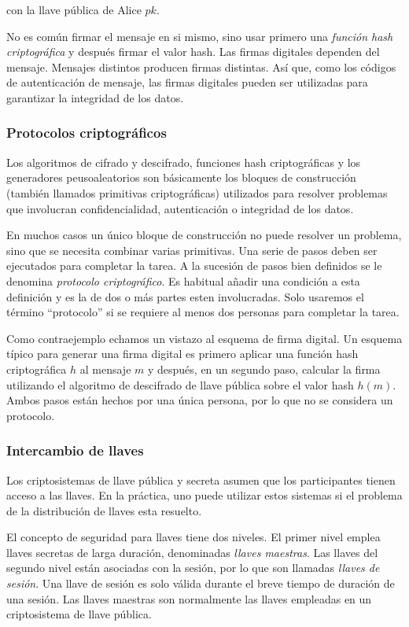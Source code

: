 \documentclass[12pt]{article}
\theoremstyle{definition}
\begin{document}
con la llave pública de Alice $pk$.

No es común firmar el mensaje en si mismo, sino usar primero una \textit{función hash criptográfica} y después firmar el valor hash. Las firmas digitales dependen del mensaje. Mensajes distintos producen firmas distintas. Así que, como los códigos de autenticación de mensaje, las firmas digitales pueden ser utilizadas para garantizar la integridad de los datos.


\subsubsection{Protocolos criptográficos}

Los algoritmos de cifrado y descifrado, funciones hash criptográficas y los generadores peusoaleatorios son básicamente los bloques de construcción (también llamados primitivas criptográficas) utilizados para resolver problemas que involucran confidencialidad, autenticación o integridad de los datos.

En muchos casos un único bloque de construcción no puede resolver un problema, sino que se necesita combinar varias primitivas. Una serie de pasos deben ser ejecutados para completar la tarea. A la sucesión de pasos bien definidos se le denomina \textit{protocolo criptográfico}. Es habitual añadir una condición a esta definición y es la de dos o más partes esten involucradas. Solo usaremos el término ``protocolo'' si se requiere al menos dos personas para completar la tarea.

Como contraejemplo echamos un vistazo al esquema de firma digital. Un esquema típico para generar una firma digital es primero aplicar una función hash criptográfica $h$ al mensaje $m$ y después, en un segundo paso, calcular la firma utilizando el algoritmo de descifrado de llave pública sobre el valor hash $h(m)$. Ambos pasos están hechos por una única persona, por lo que no se considera un protocolo.

\subsubsection{Intercambio de llaves}
Los criptosistemas de llave pública y secreta asumen que los participantes tienen acceso a las llaves. En la práctica, uno puede utilizar estos sistemas si el problema de la distribución de llaves esta resuelto.

El concepto de seguridad para llaves tiene dos niveles. El primer nivel emplea llaves secretas de larga duración, denominadas \textit{llaves maestras}. Las llaves del segundo nivel están asociadas con la sesión, por lo que son llamadas \textit{llaves de sesión}. Una llave de sesión es solo válida durante el breve tiempo de duración de una sesión. Las llaves maestras son normalmente las llaves empleadas en un criptosistema de llave pública.
\end{document}
